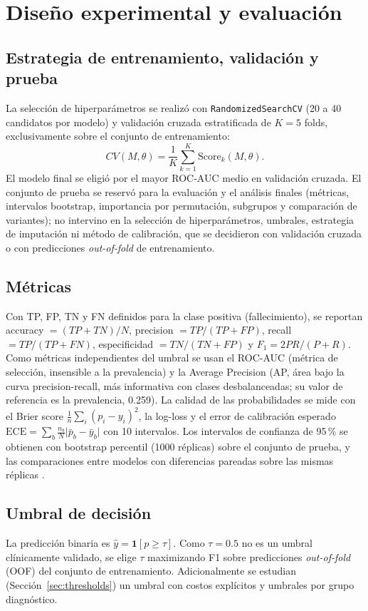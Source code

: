 \documentclass[conference]{IEEEtran}
\begin{document}


\section{Diseño experimental y evaluación}
\label{sec:design}

\subsection{Estrategia de entrenamiento, validación y prueba}
La selección de hiperparámetros se realizó con \texttt{RandomizedSearchCV} (20 a 40 candidatos por modelo) y validación cruzada estratificada de $K=5$ folds, exclusivamente sobre el conjunto de entrenamiento:
\begin{equation}
CV(M,\theta)=\frac1K\sum_{k=1}^{K}\mathrm{Score}_k(M,\theta).
\end{equation}
El modelo final se eligió por el mayor ROC-AUC medio en validación cruzada. El conjunto de prueba se reservó para la evaluación y el análisis finales (métricas, intervalos bootstrap, importancia por permutación, subgrupos y comparación de variantes); no intervino en la selección de hiperparámetros, umbrales, estrategia de imputación ni método de calibración, que se decidieron con validación cruzada o con predicciones \textit{out-of-fold} de entrenamiento.

\subsection{Métricas}
Con TP, FP, TN y FN definidos para la clase positiva (fallecimiento), se reportan accuracy $=(TP+TN)/N$, precision $=TP/(TP+FP)$, recall $=TP/(TP+FN)$, especificidad $=TN/(TN+FP)$ y $F_1=2PR/(P+R)$. Como métricas independientes del umbral se usan el ROC-AUC (métrica de selección, insensible a la prevalencia) y la Average Precision (AP, área bajo la curva precision-recall, más informativa con clases desbalanceadas; su valor de referencia es la prevalencia, 0.259). La calidad de las probabilidades se mide con el Brier score $\frac1n\sum_i(p_i-y_i)^2$, la log-loss y el error de calibración esperado $\mathrm{ECE}=\sum_b\frac{n_b}{N}\lvert\bar p_b-\bar y_b\rvert$ con 10 intervalos. Los intervalos de confianza de 95\,\% se obtienen con bootstrap percentil (1000 réplicas) sobre el conjunto de prueba, y las comparaciones entre modelos con diferencias pareadas sobre las mismas réplicas \cite{efron1993}.

\subsection{Umbral de decisión}
La predicción binaria es $\hat y=\mathbf 1[p\ge\tau]$. Como $\tau=0.5$ no es un umbral clínicamente validado, se elige $\tau$ maximizando F1 sobre predicciones \textit{out-of-fold} (OOF) del conjunto de entrenamiento. Adicionalmente se estudian (Sección~\ref{sec:thresholds}) un umbral con costos explícitos y umbrales por grupo diagnóstico.
\end{document}
